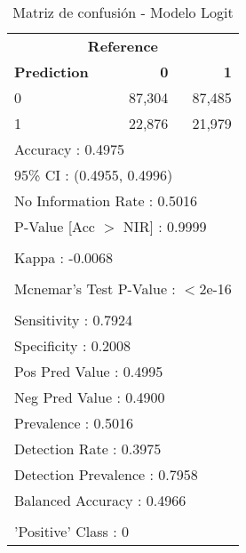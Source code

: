 \begin{table}[htbp]
\centering
\caption{Matriz de confusión - Modelo Logit}
\label{tab:13_matriz_logit}
\begin{tabular}{lrr}
\toprule
\multicolumn{3}{c}{\textbf{Reference}} \\
\textbf{Prediction} & \textbf{0} & \textbf{1} \\
\midrule
0 & 87,304 & 87,485 \\
1 & 22,876 & 21,979 \\
\midrule
\multicolumn{3}{l}{Accuracy : 0.4975} \\
\multicolumn{3}{l}{95\% CI : (0.4955, 0.4996)} \\
\multicolumn{3}{l}{No Information Rate : 0.5016} \\
\multicolumn{3}{l}{P-Value [Acc $>$ NIR] : 0.9999} \\
\\
\multicolumn{3}{l}{Kappa : -0.0068} \\
\\
\multicolumn{3}{l}{Mcnemar's Test P-Value : $<$2e-16} \\
\\
\multicolumn{3}{l}{Sensitivity : 0.7924} \\
\multicolumn{3}{l}{Specificity : 0.2008} \\
\multicolumn{3}{l}{Pos Pred Value : 0.4995} \\
\multicolumn{3}{l}{Neg Pred Value : 0.4900} \\
\multicolumn{3}{l}{Prevalence : 0.5016} \\
\multicolumn{3}{l}{Detection Rate : 0.3975} \\
\multicolumn{3}{l}{Detection Prevalence : 0.7958} \\
\multicolumn{3}{l}{Balanced Accuracy : 0.4966} \\
\\
\multicolumn{3}{l}{'Positive' Class : 0} \\
\bottomrule
\end{tabular}
\end{table}